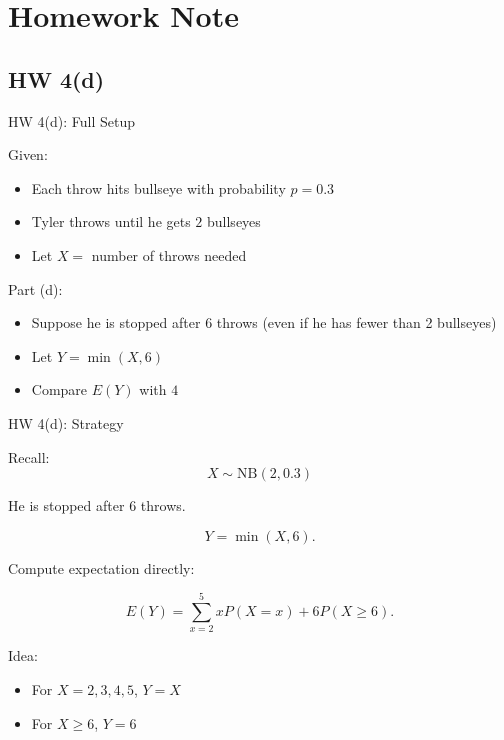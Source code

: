 \documentclass{beamer}
\begin{document}
\section{Homework Note}

\subsection{HW 4(d)}

\begin{frame}{HW 4(d): Full Setup}

Given:
\begin{itemize}
  \item Each throw hits bullseye with probability $p=0.3$
  \item Tyler throws until he gets $2$ bullseyes
  \item Let $X=$ number of throws needed
\end{itemize}

\pause

Part (d):

\begin{itemize}
  \item Suppose he is stopped after $6$ throws (even if he has fewer than 2 bullseyes)
  \item Let $Y=\min(X,6)$
  \item Compare $E(Y)$ with $4$
\end{itemize}
\end{frame}

\begin{frame}{HW 4(d): Strategy}

Recall:
\[
X \sim \mathrm{NB}(2,0.3)
\]

He is stopped after $6$ throws.

\[
Y=\min(X,6).
\]

\pause

Compute expectation directly:

\[
E(Y)
=
\sum_{x=2}^{5} x P(X=x)
+
6 P(X\ge 6).
\]

\pause

Idea:
\begin{itemize}
  \item For $X=2,3,4,5$, $Y=X$
  \item For $X\ge6$, $Y=6$
\end{itemize}

\end{frame}

\end{document}
